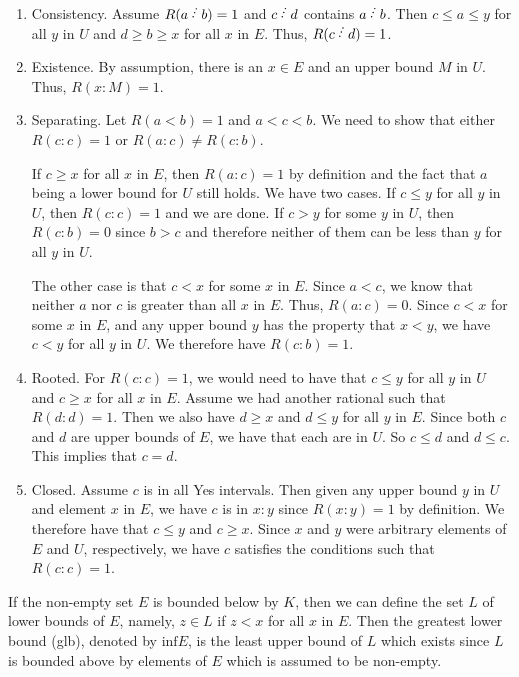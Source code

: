 \documentclass[12pt]{article}
\begin{document}
\begin{enumerate}
    \item Consistency. Assume $R(a\lte b)=1$ and $c\lte d$ contains $a\lte b$. Then $c \leq a \leq y$ for all $y$ in $U$ and $d \geq b \geq x$ for all $x$ in $E$. Thus, $R(c\lte d) = 1$.
    \item Existence. By assumption, there is an $x \in E$ and an upper bound $M$ in $U$. Thus, $R(x:M) = 1$. 
    \item Separating. Let $R(a\lt b)=1$ and $a < c< b$. We need to show that either $R(c:c)=1$ or $R(a:c) \neq R(c:b)$. 
    
    If $c \geq x$ for all $x$ in $E$, then $R(a:c)=1$ by definition and the fact that $a$ being a lower bound for $U$ still holds. We have two cases.  If $c \leq y$ for all $y$ in $U$, then $R(c:c)=1$ and we are done. If $c > y$ for some $y$ in $U$, then $R(c:b) = 0$ since $b > c$ and therefore neither of them can be less than $y$ for all $y$ in $U$. 
    
    The other case is that $c < x$ for some $x$ in $E$. Since $a < c$, we know that neither $a$ nor $c$ is greater than all $x$ in $E$. Thus, $R(a:c) = 0$. Since $c < x$ for some $x$ in $E$, and any upper bound $y$ has the property that $x < y$, we have $c < y$ for all $y$ in $U$. We therefore have $R(c:b)=1$.
    
    \item Rooted. For $R(c:c)=1$, we would need to have that $c \leq y$ for all $y$ in $U$ and $c \geq x$ for all $x$ in $E$. Assume we had another rational such that $R(d:d) = 1$. Then we also have $d \geq x$ and $d \leq y$ for all $y$ in $E$. Since both $c$ and $d$ are upper bounds of $E$, we have that each are in $U$. So $c \leq d$ and $d \leq c$. This implies that $c = d$. 
    \item Closed. Assume $c$ is in all Yes intervals. Then given any upper bound $y$ in $U$ and element $x$ in $E$, we have $c$ is in $x:y$ since $R(x:y)=1$ by definition. We therefore have that $c \leq y$ and $c \geq x$. Since $x$ and $y$ were arbitrary elements of $E$ and $U$, respectively, we have $c$ satisfies the conditions such that $R(c:c)=1$.
\end{enumerate}

If the non-empty set $E$ is bounded below by $K$, then we can define the set $L$ of lower bounds of $E$, namely, $z \in L$ if $z < x$ for all $x$ in $E$. Then the greatest lower bound (glb), denoted by $\mathrm{inf} E$, is the least upper bound of $L$ which exists since $L$ is bounded above by elements of $E$ which is assumed to be non-empty. 
\end{document}
